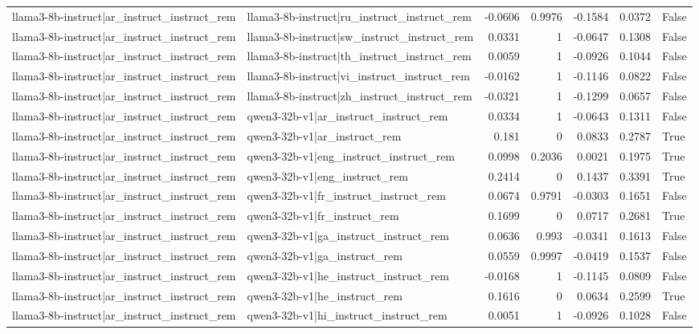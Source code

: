\begin{table}
\begin{tabular}{l l r r r r l}
llama3-8b-instruct|ar_instruct_instruct_rem & llama3-8b-instruct|ru_instruct_instruct_rem & -0.0606 & 0.9976 & -0.1584 & 0.0372 & False \\
llama3-8b-instruct|ar_instruct_instruct_rem & llama3-8b-instruct|sw_instruct_instruct_rem & 0.0331 & 1 & -0.0647 & 0.1308 & False \\
llama3-8b-instruct|ar_instruct_instruct_rem & llama3-8b-instruct|th_instruct_instruct_rem & 0.0059 & 1 & -0.0926 & 0.1044 & False \\
llama3-8b-instruct|ar_instruct_instruct_rem & llama3-8b-instruct|vi_instruct_instruct_rem & -0.0162 & 1 & -0.1146 & 0.0822 & False \\
llama3-8b-instruct|ar_instruct_instruct_rem & llama3-8b-instruct|zh_instruct_instruct_rem & -0.0321 & 1 & -0.1299 & 0.0657 & False \\
llama3-8b-instruct|ar_instruct_instruct_rem & qwen3-32b-v1|ar_instruct_instruct_rem & 0.0334 & 1 & -0.0643 & 0.1311 & False \\
llama3-8b-instruct|ar_instruct_instruct_rem & qwen3-32b-v1|ar_instruct_rem & 0.181 & 0 & 0.0833 & 0.2787 & True \\
llama3-8b-instruct|ar_instruct_instruct_rem & qwen3-32b-v1|eng_instruct_instruct_rem & 0.0998 & 0.2036 & 0.0021 & 0.1975 & True \\
llama3-8b-instruct|ar_instruct_instruct_rem & qwen3-32b-v1|eng_instruct_rem & 0.2414 & 0 & 0.1437 & 0.3391 & True \\
llama3-8b-instruct|ar_instruct_instruct_rem & qwen3-32b-v1|fr_instruct_instruct_rem & 0.0674 & 0.9791 & -0.0303 & 0.1651 & False \\
llama3-8b-instruct|ar_instruct_instruct_rem & qwen3-32b-v1|fr_instruct_rem & 0.1699 & 0 & 0.0717 & 0.2681 & True \\
llama3-8b-instruct|ar_instruct_instruct_rem & qwen3-32b-v1|ga_instruct_instruct_rem & 0.0636 & 0.993 & -0.0341 & 0.1613 & False \\
llama3-8b-instruct|ar_instruct_instruct_rem & qwen3-32b-v1|ga_instruct_rem & 0.0559 & 0.9997 & -0.0419 & 0.1537 & False \\
llama3-8b-instruct|ar_instruct_instruct_rem & qwen3-32b-v1|he_instruct_instruct_rem & -0.0168 & 1 & -0.1145 & 0.0809 & False \\
llama3-8b-instruct|ar_instruct_instruct_rem & qwen3-32b-v1|he_instruct_rem & 0.1616 & 0 & 0.0634 & 0.2599 & True \\
llama3-8b-instruct|ar_instruct_instruct_rem & qwen3-32b-v1|hi_instruct_instruct_rem & 0.0051 & 1 & -0.0926 & 0.1028 & False \\

\end{tabular}
\end{table}
